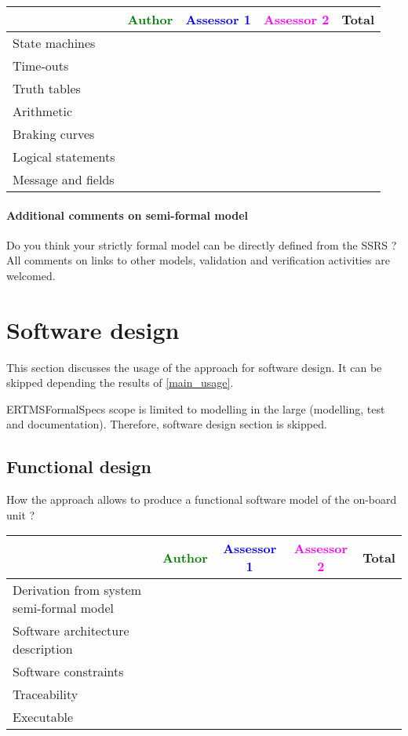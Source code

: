 \begin{author_comment}
\begin{tabular}{|l | c | c | c | c|}
\hline
& \textcolor{green}{Author} & \textcolor{blue}{Assessor 1} & \textcolor{magenta}{Assessor 2} & Total \\
\hline 
State machines  & & & &  \\
\hline
Time-outs  & & & &  \\
\hline
Truth tables  & & & &  \\
\hline
Arithmetic  & & & &  \\
\hline
Braking curves  & & & &  \\
\hline
Logical statements & & & &  \\
\hline
Message and fields & & & &  \\
\hline
\end{tabular}

\paragraph{Additional comments on semi-formal  model} Do you think your strictly formal  model can be directly defined from the SSRS ?
All comments on links to  other models, validation and verification activities are welcomed.


\section{Software design}
This section discusses the usage of the approach for software design.
It can be skipped depending the results of \ref{main_usage}.

\begin{author_comment}
ERTMSFormalSpecs scope is limited to modelling in the large (modelling, test and documentation). Therefore, software design section is skipped.  
\end{author_comment}

\subsection{Functional design}

How the approach allows to  produce a functional software model of the on-board unit ?

\begin{tabular}{|l | c | c | c | c|}
\hline
& \textcolor{green}{Author} & \textcolor{blue}{Assessor 1} & \textcolor{magenta}{Assessor 2} & Total \\
\hline
Derivation from system semi-formal model  & & & &  \\
\hline 
Software architecture description  & & & &  \\
\hline
Software constraints  & & & &  \\
\hline
Traceability  & & & &  \\
\hline
Executable  & & & &  \\
\hline
\end{tabular}


\end{author_comment}

